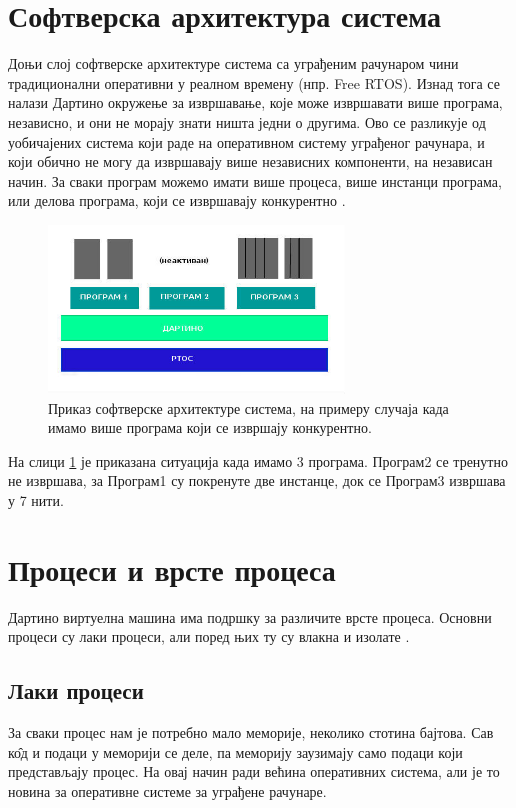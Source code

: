 \documentclass[12pt,oneside]{memoir}
\begin{document}
\section{Софтверска архитектура система}
\label{arhitektura}

Доњи слој софтверске архитектуре система са уграђеним рачунаром чини традиционални оперативни у реалном времену (нпр. Free RTOS). Изнад тога се налази Дартино окружење за извршавање, које може извршавати више програма, независно, и они не морају знати ништа једни о другима. Ово се разликује од уобичајених система који раде на оперативном систему уграђеног рачунара, и који обично не могу да извршавају више независних компоненти, на независан начин. За сваки програм можемо имати више процеса, више инстанци програма, или делова програма, који се извршавају конкурентно \cite{Dartino}.

\begin{figure}[!ht]
  \centering
  \includegraphics[width=0.7\textwidth]{arhitektura.jpg}
  \caption{Приказ софтверске архитектуре система, на примеру случаја када имамо више програма који се извршају конкурентно.}
  \label{fig:model}
\end{figure}
На слици \ref{fig:model} је приказана ситуација када имамо 3 програма. Програм2 се тренутно не извршава, за Програм1 су покренуте две инстанце, док се Програм3  извршава у 7 нити.

\section{Процеси и врсте процеса}
\label{procesi}
Дартино виртуелна машина има подршку за различите врсте процеса. Основни процеси су лаки процеси, али поред њих ту су влакна и изолате \cite{Dartino, procesi_i_izolate, korutine_i_vlakna}.
\subsection{Лаки процеси}
\label{laki_procesi}
За сваки процес нам је потребно мало меморије, неколико стотина бајтова. Сав к\^{о}д и подаци у меморији се деле, па меморију заузимају само подаци који представљају процес. На овај начин ради већина оперативних система, али је то новина за оперативне системе за уграђене рачунаре.
\end{document}
